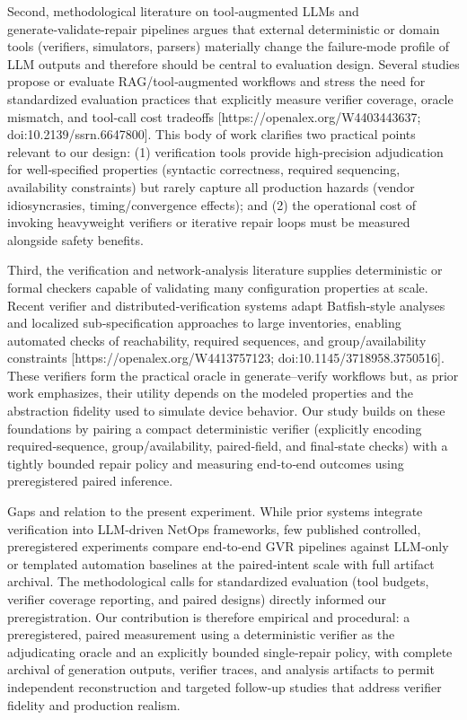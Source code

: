 \documentclass[conference]{IEEEtran}
\begin{document}
Second, methodological literature on tool‑augmented LLMs and generate‑validate‑repair pipelines argues that external deterministic or domain tools (verifiers, simulators, parsers) materially change the failure‑mode profile of LLM outputs and therefore should be central to evaluation design. Several studies propose or evaluate RAG/tool‑augmented workflows and stress the need for standardized evaluation practices that explicitly measure verifier coverage, oracle mismatch, and tool‑call cost tradeoffs [https://openalex.org/W4403443637; doi:10.2139/ssrn.6647800]. This body of work clarifies two practical points relevant to our design: (1) verification tools provide high‑precision adjudication for well‑specified properties (syntactic correctness, required sequencing, availability constraints) but rarely capture all production hazards (vendor idiosyncrasies, timing/convergence effects); and (2) the operational cost of invoking heavyweight verifiers or iterative repair loops must be measured alongside safety benefits.

Third, the verification and network‑analysis literature supplies deterministic or formal checkers capable of validating many configuration properties at scale. Recent verifier and distributed‑verification systems adapt Batfish‑style analyses and localized sub‑specification approaches to large inventories, enabling automated checks of reachability, required sequences, and group/availability constraints [https://openalex.org/W4413757123; doi:10.1145/3718958.3750516]. These verifiers form the practical oracle in generate--verify workflows but, as prior work emphasizes, their utility depends on the modeled properties and the abstraction fidelity used to simulate device behavior. Our study builds on these foundations by pairing a compact deterministic verifier (explicitly encoding required‑sequence, group/availability, paired‑field, and final‑state checks) with a tightly bounded repair policy and measuring end‑to‑end outcomes using preregistered paired inference.

Gaps and relation to the present experiment. While prior systems integrate verification into LLM‑driven NetOps frameworks, few published controlled, preregistered experiments compare end‑to‑end GVR pipelines against LLM‑only or templated automation baselines at the paired‑intent scale with full artifact archival. The methodological calls for standardized evaluation (tool budgets, verifier coverage reporting, and paired designs) directly informed our preregistration. Our contribution is therefore empirical and procedural: a preregistered, paired measurement using a deterministic verifier as the adjudicating oracle and an explicitly bounded single‑repair policy, with complete archival of generation outputs, verifier traces, and analysis artifacts to permit independent reconstruction and targeted follow‑up studies that address verifier fidelity and production realism.
\end{document}
